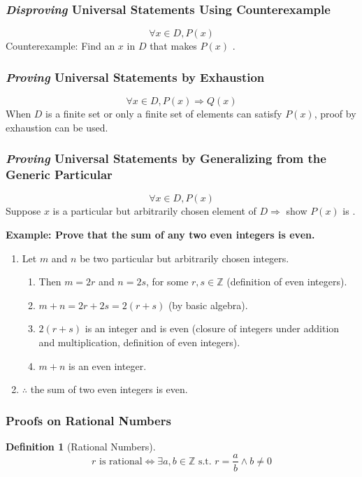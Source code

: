 \documentclass{article}
\theoremstyle{plain}
\theoremstyle{definition}
\newtheorem*{definition}{Definition}
\theoremstyle{remark}
\begin{document}
\subsubsection{\textit{Disproving} Universal Statements Using Counterexample}
\[\forall x \in D, P(x)\]
Counterexample: Find an $x$ in $D$ that makes $P(x)$ \textcolor{red}{}.

\subsubsection{\textit{Proving} Universal Statements by Exhaustion}
\[\forall x \in D, P(x) \Rightarrow Q(x)\]
When $D$ is a finite set or only a finite set of elements can satisfy $P(x)$, proof by exhaustion can be used.

\subsubsection{\textit{Proving} Universal Statements by Generalizing from the Generic Particular}
\[\forall x \in D, P(x)\]
Suppose $x$ is a particular but arbitrarily chosen element of $D \Rightarrow$ show $P(x)$ is \textcolor{blue}{}.

\textbf{Example: Prove that the sum of any two even integers is even.}
\begin{enumerate}[label=\arabic*.] 
    \item Let $m$ and $n$ be two particular but arbitrarily chosen integers.
    \begin{enumerate}[label*=\arabic*.] 
        \item Then $m = 2r$ and $n = 2s$, for some $r, s \in \mathbb{Z}$ (definition of even integers).
        \item $m + n = 2r + 2s = 2(r + s)$ (by basic algebra).
        \item $2(r + s)$ is an integer and is even (closure of integers under addition and multiplication, definition of even integers).
        \item $m + n$ is an even integer.
    \end{enumerate}
    \item $\therefore$ the sum of two even integers is even.
\end{enumerate}

\subsubsection{Proofs on Rational Numbers}
\begin{definition}[Rational Numbers]
    \[ r \text{ is rational} \Leftrightarrow \exists a,b \in \mathbb{Z} \text{ s.t. } r = \frac{a}{b} \wedge b \neq 0 \]
\end{definition}
\end{document}
